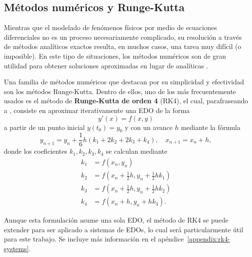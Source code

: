 \subsection{Métodos numéricos y Runge-Kutta}

Mientras que el modelado de fenómenos físicos por medio de ecuaciones diferenciales no es un proceso necesariamente complicado, su resolución a través de métodos analíticos exactos resulta, en muchos casos, una tarea muy difícil (o imposible). En este tipo de situaciones, los métodos numéricos son de gran utilidad para obtener soluciones aproximadas en lugar de analíticas \citep{reddy}.

Una familia de métodos numéricos que destacan por su simplicidad y efectividad son los métodos Runge-Kutta. Dentro de ellos, uno de los más frecuentemente usados es el método de \textbf{Runge-Kutta de orden 4} (RK4), el cual, parafraseando a \citet{suli}, consiste en aproximar iterativamente una EDO de la forma
\[
    y'(x) = f(x, y)
\]
a partir de un punto inicial \(y(t_0) = y_0\) y con un avance \(h\) mediante la fórmula
\[
    y_{n+1} = y_n + \frac{1}{6}h(k_1 + 2k_2 + 2k_3 + k_4), \quad x_{n+1} = x_n + h
,\]
donde los coeficientes \(k_1, k_2, k_3, k_4\) se calculan mediante
\begin{align*}
    k_1 &= f(x_n, y_n) \\
    k_2 &= f(x_n + \frac{1}{2}h, y_n + \frac{1}{2}hk_1) \\
    k_3 &= f(x_n + \frac{1}{2}h, y_n + \frac{1}{2}hk_2) \\
    k_4 &= f(x_n + h, y_n + hk_3)
.\end{align*}

Aunque esta formulación asume una sola EDO, el método de RK4 se puede extender para ser aplicado a sistemas de EDOs, lo cual será particularmente útil para este trabajo. Se incluye más información en el apéndice~\ref{appendix:rk4-systems}.

